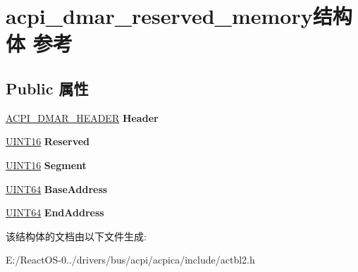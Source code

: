 \hypertarget{structacpi__dmar__reserved__memory}{}\section{acpi\+\_\+dmar\+\_\+reserved\+\_\+memory结构体 参考}
\label{structacpi__dmar__reserved__memory}
\subsection*{Public 属性}
\begin{DoxyCompactItemize}
\item 
\mbox{\label{structacpi__dmar__reserved__memory_a78b4204170718b4e9fe2219951b5a6b6}} 
\hyperlink{structacpi__dmar__header}{A\+C\+P\+I\+\_\+\+D\+M\+A\+R\+\_\+\+H\+E\+A\+D\+ER} {\bfseries Header}
\item 
\mbox{\label{structacpi__dmar__reserved__memory_af4e8338ca7884fbae11746589bad4868}} 
\hyperlink{_processor_bind_8h_a09f1a1fb2293e33483cc8d44aefb1eb1}{U\+I\+N\+T16} {\bfseries Reserved}
\item 
\mbox{\label{structacpi__dmar__reserved__memory_a9b3a843fdf71c60410600b9fa8733093}} 
\hyperlink{_processor_bind_8h_a09f1a1fb2293e33483cc8d44aefb1eb1}{U\+I\+N\+T16} {\bfseries Segment}
\item 
\mbox{\label{structacpi__dmar__reserved__memory_a0442275412251fecf4b61c2d0151c6dd}} 
\hyperlink{_processor_bind_8h_a57be03562867144161c1bfee95ca8f7c}{U\+I\+N\+T64} {\bfseries Base\+Address}
\item 
\mbox{\label{structacpi__dmar__reserved__memory_a425ed32d6ce3c69967620e883010d58f}} 
\hyperlink{_processor_bind_8h_a57be03562867144161c1bfee95ca8f7c}{U\+I\+N\+T64} {\bfseries End\+Address}
\end{DoxyCompactItemize}


该结构体的文档由以下文件生成\+:\begin{DoxyCompactItemize}
\item 
E\+:/\+React\+O\+S-\/0../drivers/bus/acpi/acpica/include/actbl2.\+h\end{DoxyCompactItemize}
